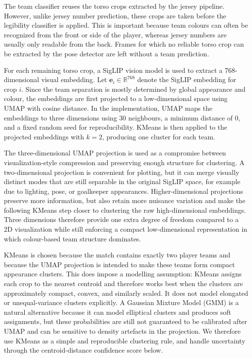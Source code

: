 The team classifier reuses the torso crops extracted by the jersey pipeline. However, unlike jersey number prediction, these crops are taken before the legibility classifier is applied. This is important because team colours can often be recognized from the front or side of the player, whereas jersey numbers are usually only readable from the back. Frames for which no reliable torso crop can be extracted by the pose detector are left without a team prediction.

For each remaining torso crop, a SigLIP vision model is used to extract a 768-dimensional visual embedding. Let $\mathbf{e}_i \in \mathbb{R}^{768}$ denote the SigLIP embedding for crop $i$. Since the team separation is mostly determined by global appearance and colour, the embeddings are first projected to a low-dimensional space using UMAP with cosine distance. In the implementation, UMAP maps the embeddings to three dimensions using $30$ neighbours, a minimum distance of $0$, and a fixed random seed for reproducibility. KMeans is then applied to the projected embeddings with $k=2$, producing one cluster for each team.

The three-dimensional UMAP projection is used as a compromise between visualization-style compression and preserving enough structure for clustering. A two-dimensional projection is convenient for plotting, but it can merge visually distinct modes that are still separable in the original SigLIP space, for example due to lighting, pose, or goalkeeper appearances. Higher-dimensional projections preserve more information, but also retain more nuisance variation and make the following KMeans step closer to clustering the raw high-dimensional embeddings. Three dimensions therefore provide one extra degree of freedom compared to a 2D visualization while still enforcing a compact low-dimensional representation in which colour-based team structure dominates.

KMeans is chosen because the match contains exactly two player teams and because the UMAP projection is intended to make these teams form compact appearance clusters. This does impose a modelling assumption: KMeans assigns each crop to the nearest centroid and therefore works best when the clusters are approximately compact, convex, and similarly scaled. It does not model elongated or unequal-variance clusters explicitly. A Gaussian Mixture Model (GMM) is a natural alternative because it can model elliptical clusters and produces soft assignments, but these probabilities are still not guaranteed to be calibrated after UMAP and can be sensitive to density artefacts in the projection. We therefore use KMeans as a simple and reproducible clustering rule, and handle uncertainty through the centroid-distance confidence score below.

